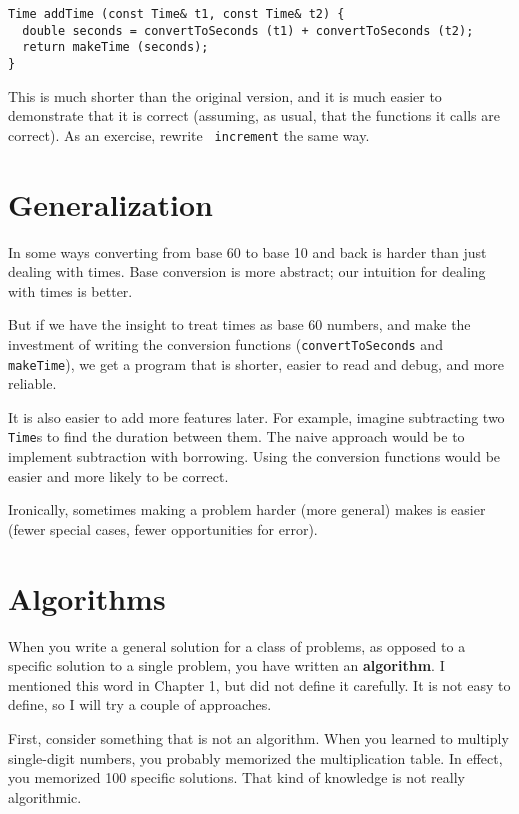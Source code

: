 \begin{verbatim}
Time addTime (const Time& t1, const Time& t2) {
  double seconds = convertToSeconds (t1) + convertToSeconds (t2);
  return makeTime (seconds);
}
\end{verbatim}
%
This is much shorter than the original version, and it is much easier
to demonstrate that it is correct (assuming, as usual, that the
functions it calls are correct).  As an exercise, rewrite {\tt
increment} the same way.


\section{Generalization}

In some ways converting from base 60 to base 10 and back is
harder than just dealing with times.  Base conversion is more
abstract; our intuition for dealing with times is better.

But if we have the insight to treat times as base 60 numbers,
and make the investment of writing the conversion functions
({\tt convertToSeconds} and {\tt makeTime}), we get
a program that is shorter, easier to read and debug, and more
reliable.

It is also easier to add more features later.  For example, imagine
subtracting two {\tt Time}s to find the duration between them.  The
naive approach would be to implement subtraction with
borrowing.  Using the conversion functions would be easier and more
likely to be correct.

Ironically, sometimes making a problem harder (more general)
makes is easier (fewer special cases, fewer opportunities for error).

\section{Algorithms}
\label{algorithm}

When you write a general solution for a class of problems, as opposed
to a specific solution to a single problem, you have written an {\bf
algorithm}.  I mentioned this word in Chapter 1, but did not define it
carefully.  It is not easy to define, so I will try a couple of
approaches.

First, consider something that is not an algorithm.
When you learned to multiply single-digit numbers, you probably
memorized the multiplication table.  In effect, you memorized 100
specific solutions.  That kind of knowledge is not really algorithmic.


